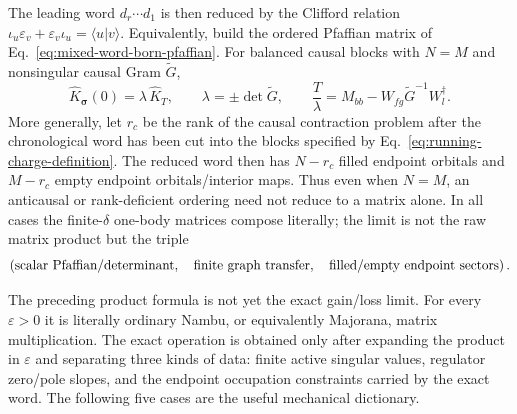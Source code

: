 \documentclass[aps,prb,onecolumn,nofootinbib,superscriptaddress]{revtex4-2}
\theoremstyle{plain}
\theoremstyle{definition}
\begin{document}
The leading word \(d_r\cdots d_1\) is then reduced by the Clifford relation
\(\iota_u\varepsilon_v+\varepsilon_v\iota_u=\langle u|v\rangle\).  Equivalently,
build the ordered Pfaffian matrix of
Eq.~\eqref{eq:mixed-word-born-pfaffian}.  For balanced causal blocks with
\(N=M\) and nonsingular causal Gram \(\widetilde G\),
\begin{equation}
  \hat K_{\bm\sigma}(0)
  =
  \lambda\,\hat K_T,
  \qquad
  \lambda=\pm\det\widetilde G,
  \qquad
  \frac{T}{\lambda}
  =
  M_{bb}-W_{fg}\widetilde G^{-1}W_l^\dagger .
  \label{eq:general-balanced-master-limit}
\end{equation}
More generally, let \(r_c\) be the rank of the causal contraction problem
after the chronological word has been cut into the blocks specified by
Eq.~\eqref{eq:running-charge-definition}.  The reduced word then has
\(N-r_c\) filled endpoint orbitals and \(M-r_c\) empty endpoint
orbitals/interior maps.  Thus even when \(N=M\), an anticausal or
rank-deficient ordering need not reduce to a matrix alone.  In all cases the
finite-\(\delta\) one-body matrices compose literally; the limit is not the
raw matrix product but the triple
\begin{equation}
  \left(
  \hbox{scalar Pfaffian/determinant},
  \quad
  \hbox{finite graph transfer},
  \quad
  \hbox{filled/empty endpoint sectors}
  \right).
  \label{eq:general-regulated-limit-data}
\end{equation}

\iffalse
The preceding product formula is not yet the exact gain/loss limit.  For
every \(\varepsilon>0\) it is literally ordinary Nambu, or equivalently
Majorana, matrix multiplication.  The exact operation is obtained only after
expanding the product in \(\varepsilon\) and separating three kinds of data:
finite active singular values, regulator zero/pole slopes, and the endpoint
occupation constraints carried by the exact word.  The following five cases
are the useful mechanical dictionary.
\end{document}
